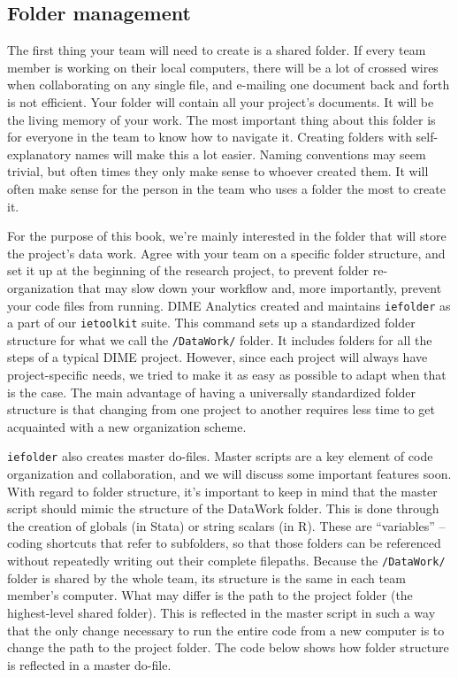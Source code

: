 \subsection{Folder management}

The first thing your team will need to create is a shared folder.
If every team member is working on their local computers, 
there will be a lot of crossed wires when collaborating on any single file,
and e-mailing one document back and forth is not efficient.
Your folder will contain all your project's documents.
It will be the living memory of your work.
The most important thing about this folder is for everyone in the team to know how to navigate it.
Creating folders with self-explanatory names will make this a lot easier. 
Naming conventions may seem trivial, 
but often times they only make sense to whoever created them.
It will often make sense for the person in the team who uses a folder the most to create it.

For the purpose of this book, 
we're mainly interested in the folder that will store the project's data work.
Agree with your team on a specific folder structure, and
set it up at the beginning of the research project,
to prevent folder re-organization that may slow down your workflow and,
more importantly, prevent your code files from running.
DIME Analytics created and maintains 
\texttt{iefolder} 
as a part of our \texttt{ietoolkit} suite.
This command sets up a standardized folder structure for what we call the \texttt{/DataWork/} folder.
It includes folders for all the steps of a typical DIME project.
However, since each project will always have project-specific needs,
we tried to make it as easy as possible to adapt when that is the case.
The main advantage of having a universally standardized folder structure 
is that changing from one project to another requires less 
time to get acquainted with a new organization scheme.

\texttt{iefolder} also creates master do-files.
Master scripts are a key element of code organization and collaboration,
and we will discuss some important features soon.
With regard to folder structure, it's important to keep in mind
that the master script should mimic the structure of the DataWork folder.
This is done through the creation of globals (in Stata) or string scalars (in R).
These are ``variables'' -- coding shortcuts that refer to subfolders, 
so that those folders can be referenced without repeatedly writing out their complete filepaths.
Because the \texttt{/DataWork/} folder is shared by the whole team,
its structure is the same in each team member's computer.
What may differ is the path to the project folder (the highest-level shared folder).
This is reflected in the master script in such a way that 
the only change necessary to run the entire code from a new computer 
is to change the path to the project folder. 
The code below shows how folder structure is reflected in a master do-file.


